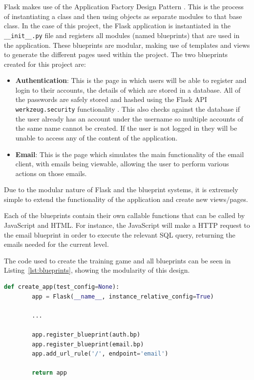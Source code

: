 \documentclass{l4proj}
\begin{document}
Flask makes use of the Application Factory Design Pattern \citep{flask}. This is the process of instantiating a class and then using objects as separate modules to that base class. In the case of this project, the Flask application is instantiated in the \verb| __init__.py| file and registers all modules (named blueprints) that are used in the application. These blueprints are modular, making use of templates and views to generate the different pages used within the project. The two blueprints created for this project are:

\begin{itemize}
  \item \textbf{Authentication}: This is the page in which users will be able to register and login to their accounts, the details of which are stored in a database. All of the passwords are safely stored and hashed using the Flask API \verb|werkzeug.security| functionality \citep{werkzeugSecurity}. This also checks against the database if the user already has an account under the username so multiple accounts of the same name cannot be created. If the user is not logged in they will be unable to access any of the content of the application.
  \item \textbf{Email}: This is the page which simulates the main functionality of the email client, with emails being viewable, allowing the user to perform various actions on those emails.
\end{itemize}

Due to the modular nature of Flask and the blueprint systems, it is extremely simple to extend the functionality of the application and create new views/pages.

Each of the blueprints contain their own callable functions that can be called by JavaScript and HTML. For instance, the JavaScript will make a HTTP request to the email blueprint in order to execute the relevant SQL query, returning the emails needed for the current level.

The code used to create the training game and all blueprints can be seen in Listing~\ref{lst:blueprints}, showing the modularity of this design.

\begin{lstlisting}[H, language=python, caption={Creation of training app and all associated blueprints in the \_\_init\_\_.py file}, label=lst:blueprints]
    def create_app(test_config=None):
    	app = Flask(__name__, instance_relative_config=True)
    	
        ...
    
    	app.register_blueprint(auth.bp)
    	app.register_blueprint(email.bp)
    	app.add_url_rule('/', endpoint='email')
    
    	return app
\end{lstlisting}
\end{document}
